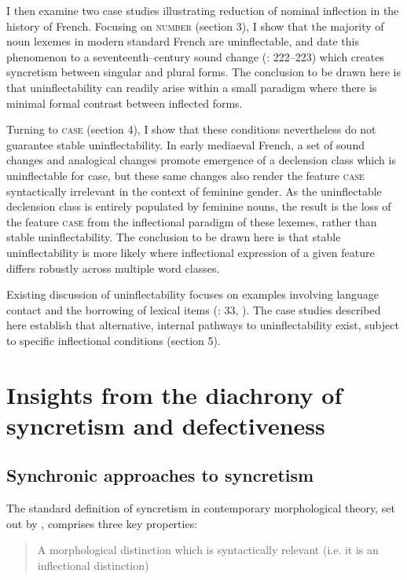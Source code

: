 \documentclass[output=paper]{langscibook}
\begin{document}
I then examine two case studies illustrating reduction of nominal inflection in the history of French. Focusing on \textsc{number} (section 3), I show that the majority of noun lexemes in modern standard French are uninflectable, and date this phenomenon to a seventeenth–century sound change (\citealt{Pope1934}: 222–223) which creates syncretism between singular and plural forms. The conclusion to be drawn here is that uninflectability can readily arise within a small paradigm where there is minimal formal contrast between inflected forms. 

Turning to \textsc{case} (section 4), I show that these conditions nevertheless do not guarantee stable uninflectability. In early mediaeval French, a set of sound changes and analogical changes promote emergence of a declension class which is uninflectable for case, but these same changes also render the feature \textsc{case} syntactically irrelevant in the context of feminine gender. As the uninflectable declension class is entirely populated by feminine nouns, the result is the loss of the feature \textsc{case} from the inflectional paradigm of these lexemes, rather than stable uninflectability. The conclusion to be drawn here is that stable uninflectability is more likely where inflectional expression of a given feature differs robustly across multiple word classes.

Existing discussion of uninflectability focuses on examples involving language contact and the borrowing of lexical items (\citealt{BaermanEtAl2005}: 33, \citealt{Spencer2020}). The case studies described here establish that alternative, internal pathways to uninflectability exist, subject to specific inflectional conditions (section 5).

\section{Insights from the diachrony of syncretism and defectiveness}
\subsection{Synchronic approaches to syncretism} %

The standard definition of syncretism in contemporary morphological theory, set out by \citet{BaermanEtAl2005}, comprises three key properties:

\begin{quote}
A morphological distinction which is syntactically relevant (i.e. it is an inflectional distinction)
\end{quote}
\end{document}
